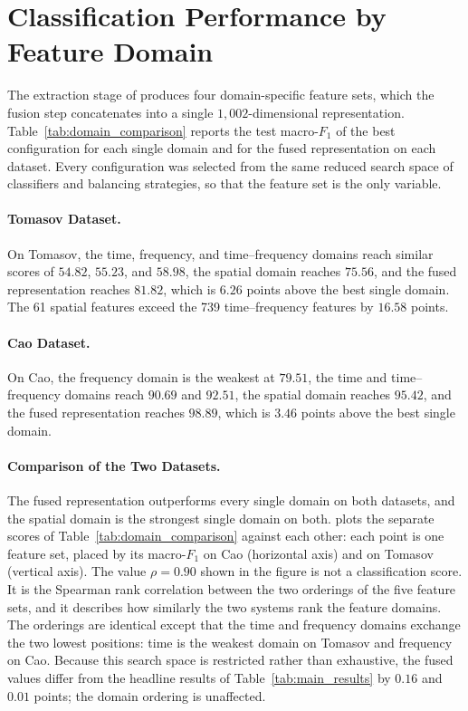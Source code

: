 \section{Classification Performance by Feature Domain}
\label{sec:resDomains}
The extraction stage of  produces four domain-specific feature sets, which the fusion step concatenates into a single $1{,}002$-dimensional representation. Table~\ref{tab:domain_comparison} reports the test macro-$F_1$ of the best configuration for each single domain and for the fused representation on each dataset. Every configuration was selected from the same reduced search space of classifiers and balancing strategies, so that the feature set is the only variable.

\paragraph[Tomasov Dataset]{Tomasov Dataset.}
On Tomasov, the time, frequency, and time--frequency domains reach similar scores of $54.82$, $55.23$, and $58.98$, the spatial domain reaches $75.56$, and the fused representation reaches $81.82$, which is $6.26$ points above the best single domain. The 61 spatial features exceed the 739 time--frequency features by $16.58$ points.

\paragraph[Cao Dataset]{Cao Dataset.}
On Cao, the frequency domain is the weakest at $79.51$, the time and time--frequency domains reach $90.69$ and $92.51$, the spatial domain reaches $95.42$, and the fused representation reaches $98.89$, which is $3.46$ points above the best single domain.

\paragraph[Comparison of the Two Datasets]{Comparison of the Two Datasets.}
The fused representation outperforms every single domain on both datasets, and the spatial domain is the strongest single domain on both.  plots the separate scores of Table~\ref{tab:domain_comparison} against each other: each point is one feature set, placed by its macro-$F_1$ on Cao (horizontal axis) and on Tomasov (vertical axis). The value $\rho = 0.90$ shown in the figure is not a classification score. It is the Spearman rank correlation between the two orderings of the five feature sets, and it describes how similarly the two systems rank the feature domains. The orderings are identical except that the time and frequency domains exchange the two lowest positions: time is the weakest domain on Tomasov and frequency on Cao. Because this search space is restricted rather than exhaustive, the fused values differ from the headline results of Table~\ref{tab:main_results} by $0.16$ and $0.01$ points; the domain ordering is unaffected.

